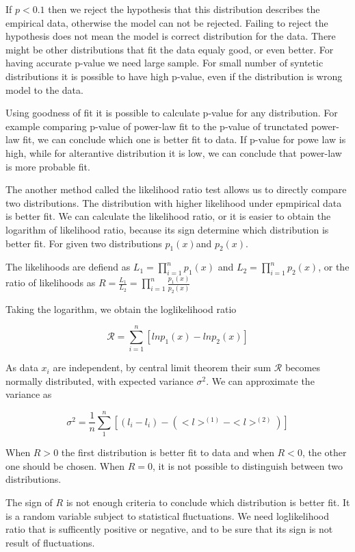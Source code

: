 If $p<0.1$ then we reject the hypothesis that this distribution describes the empirical data, otherwise the model can not be rejected. Failing to reject the hypothesis does not mean the model is correct distribution for the data. There might be other distributions that fit the data equaly good, or even better. For having accurate p-value we need large sample. For small number of syntetic distributions it is possible to have high p-value, even if the distribution is wrong model to the data. 

Using goodness of fit it is possible to calculate p-value for any distribution. For example comparing p-value of power-law fit to the p-value of trunctated power-law fit, we can conclude which one is better fit to data. If p-value for powe law is high, while for alterantive distribution it is low, we can conclude that power-law is more probable fit. 

The another method called the likelihood ratio test allows us to directly compare two distributions. The distribution with higher likelihood under epmpirical data is better fit. We can calculate the likelihood ratio, or it is easier to obtain the logarithm of likelihood ratio, because its sign determine which distribution is better fit. For given two distributions $p_1(x)$and $p_2(x)$. 

The likelihoods are defiend as $L_1=\prod_{i=1}^{n}p_1(x)$ and $L_2=\prod_{i=1}^{n}p_2(x)$, or the ratio of likelihoods as $R=\frac{L_1}{L_2} = \prod_{i=1}^{n} \frac{p_1(x)}{p_2(x)}$

Taking the logarithm, we obtain the loglikelihood ratio

\begin{equation}
\mathcal{R} = \sum_{i=1}^{n} \left[ln p_1(x) - ln p_2(x)\right]
\end{equation}

As data $x_i$ are independent, by central limit theorem their sum $\mathcal{R}$ becomes normally distributed, with expected variance $\sigma^2$. We can approximate the variance as 

$$\sigma^2 = \frac{1}{n}\sum_{1}^{n}[(l_i - l_i) - (<l>^{(1)}- <l>^{(2)})]$$

When $R>0$ the first distribution is better fit to data and when $R<0$, the other one should be chosen. When $R=0$, it is not possible to distinguish between two distributions. 

The sign of $R$ is not enough criteria to conclude which distribution is better fit. It is a random variable subject to statistical fluctuations. We need loglikelihood ratio that is sufficently positive or negative, and to be sure that its sign is not result of fluctuations.

